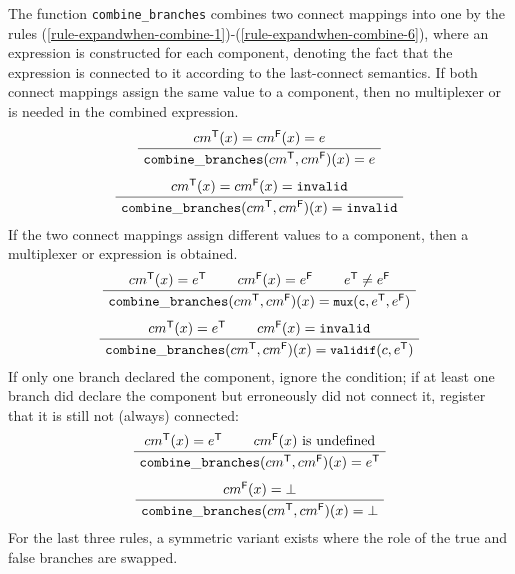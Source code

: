 The function {\tt combine\_branches} combines two connect mappings into one by the rules (\ref{rule-expandwhen-combine-1})-(\ref{rule-expandwhen-combine-6}), where an expression is constructed for each component, denoting the fact that the expression is connected to it according to the last-connect semantics. 
If both connect mappings assign the same value to a component, then no multiplexer or  is needed in the combined expression.
\begin{gather}
 \label{rule-expandwhen-combine-1}
    \infer[]
    {{\tt combine\_branches}(cm^\mathsf{T},cm^\mathsf{F})(x) = e}
    {cm^\mathsf{T}(x) = cm^\mathsf{F}(x) = e}
\\[1ex]
 \label{rule-expandwhen-combine-2}
    \infer[]
    {{\tt combine\_branches}(cm^\mathsf{T},cm^\mathsf{F})(x) = {\tt invalid}}
    {cm^\mathsf{T}(x) = cm^\mathsf{F}(x) = {\tt invalid}}
\end{gather}
If the two connect mappings assign different values to a component, then a multiplexer or  expression is obtained.  
\begin{gather}
 \label{rule-expandwhen-combine-3}
    \inferiii[]
    {{\tt combine\_branches}(cm^\mathsf{T},cm^\mathsf{F})(x) = \text{\prettyll{mux}}(\text{\prettyll{c}},e^\mathsf{T},e^\mathsf{F})}
    {cm^\mathsf{T}(x) = e^\mathsf{T}}
    {cm^\mathsf{F}(x) = e^\mathsf{F}}
    {e^\mathsf{T} \not= e^\mathsf{F}}
\\[1ex]
 \label{rule-expandwhen-combine-4}
    \inferii[]
    {{\tt combine\_branches}(cm^\mathsf{T},cm^\mathsf{F})(x) = \text{\prettyll{validif}}(c,e^\mathsf{T})}
    {cm^\mathsf{T}(x) = e^\mathsf{T}}
    {cm^\mathsf{F}(x) = {\tt invalid}}
\end{gather}
If only one branch declared the component, ignore the condition;
if at least one branch did declare the component but erroneously did not connect it,
register that it is still not (always) connected:
\begin{gather}
 \label{rule-expandwhen-combine-5}
    \inferii[]
    {{\tt combine\_branches}(cm^\mathsf{T},cm^\mathsf{F})(x) = e^\mathsf{T}}
    {cm^\mathsf{T}(x) = e^\mathsf{T}}
    {cm^\mathsf{F}(x) \text{ is undefined}}
\\[1ex]
 \label{rule-expandwhen-combine-6}
    \infer[]
    {{\tt combine\_branches}(cm^\mathsf{T},cm^\mathsf{F})(x) =\bot}
    {cm^\mathsf{F}(x) = \bot}
\end{gather}
For the last three rules, a symmetric variant exists where the role of the true and false branches are swapped.

